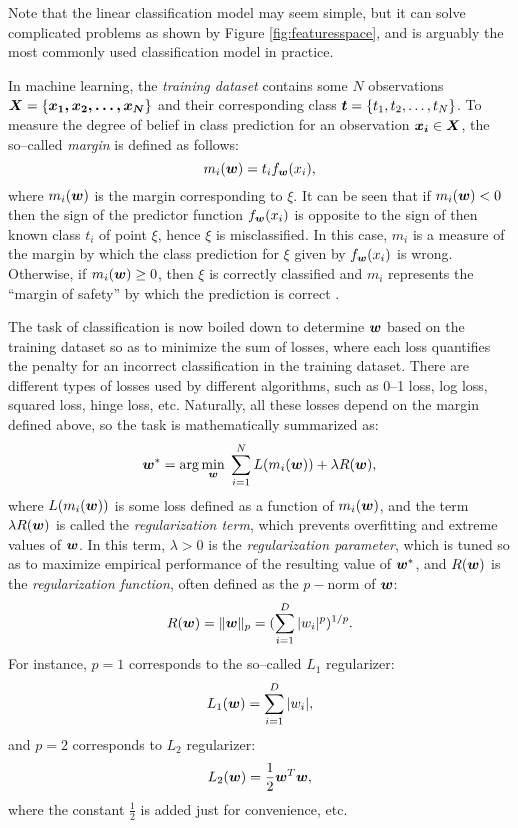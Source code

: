Note that the linear classification model may seem simple, but it can solve complicated problems as shown by Figure \ref{fig:featuresspace}, and is arguably the most commonly used classification model in practice. 

In machine learning, the \emph{training dataset} contains some $N$ observations $\boldsymbol{X} = \{\boldsymbol{x_1, x_2, \dots, x_N}\}$ and their corresponding class $\boldsymbol{t} = \{t_1, t_2, \dots, t_N\}$. To measure the degree of belief in class prediction for an observation $\boldsymbol{x_i} \in \boldsymbol{X}$, the so--called \emph{margin} is defined as follows:
\begin{equation} 
\label{eq:margin}
m_i(\boldsymbol{w}) = t_i f_{\boldsymbol{w}}(x_i),
\end{equation}
where $m_i(\boldsymbol{w})$ is the margin corresponding to $\xi$. It can be seen that if $m_i(\boldsymbol{w}) < 0$ then the sign of the predictor function $f_{\boldsymbol{w}}(x_i)$ is opposite to the sign of then known class $t_i$ of point $\xi$, hence $\xi$ is misclassified. In this case, $m_i$ is a measure of the margin by which the class prediction for $\xi$ given by $f_{\boldsymbol{w}}(x_i)$ is wrong. Otherwise, if $m_i(\boldsymbol{w}) \geq 0$, then $\xi$ is correctly classified and $m_i$ represents the ``margin of safety'' by which the prediction is correct \cite{McAllester}.  

The task of classification is now boiled down to determine $\boldsymbol{w}$ based on the training dataset so as to minimize the sum of losses, where each loss quantifies the penalty for an incorrect classification in the training dataset. There are different types of losses used by different algorithms, such as 0--1 loss, log loss, squared loss, hinge loss, etc. Naturally, all these losses depend on the margin defined above, so the task is mathematically summarized as:
\begin{equation}
\label{eq:objective}
 \boldsymbol{w}^* = \arg\min_{\boldsymbol{w}} \; \sum_{i=1}^{N} L(m_i(\boldsymbol{w})) + \lambda R(\boldsymbol{w}),
\end{equation}
where $L(m_i(\boldsymbol{w}))$ is some loss defined as a function of $m_i(\boldsymbol{w})$, and the term $\lambda R(\boldsymbol{w})$ is called the \emph{regularization term}, which prevents overfitting and extreme values of $\boldsymbol{w}$. In this term, $\lambda > 0$ is the \emph{regularization parameter}, which is tuned so as to maximize empirical performance of the resulting value of $\boldsymbol{w}^*$, and $R(\boldsymbol{w})$ is the \emph{regularization function}, often defined as the $p-$norm of $\boldsymbol{w}$: 
$$R(\boldsymbol{w}) = \| \boldsymbol{w} \|_p = (\sum_{i=1}^D |w_i|^p)^{1/p}.$$
For instance, $p=1$ corresponds to the so--called $L_1$ regularizer: $$L_1(\boldsymbol{w}) = \sum_{i=1}^D |w_i|,$$ 
and $p=2$ corresponds to $L_2$ regularizer: $$L_2(\boldsymbol{w}) = \frac{1}{2} \boldsymbol{w}^T \boldsymbol{w},$$ where the constant $\frac{1}{2}$ is added just for convenience, etc. 

